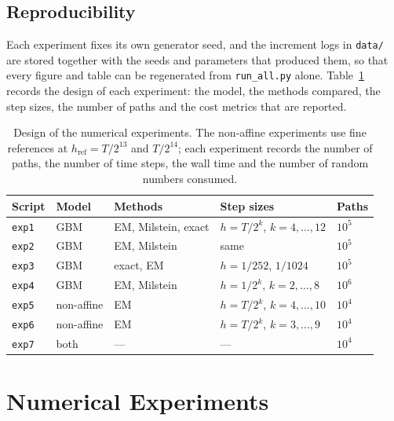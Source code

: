 \documentclass[11pt,a4paper]{article}
\theoremstyle{definition}
\theoremstyle{remark}
\begin{document}
\subsection{Reproducibility}
\label{sec:reproducibility}

Each experiment fixes its own generator seed, and the increment logs in
\texttt{data/} are stored together with the seeds and parameters that produced
them, so that every figure and table can be regenerated from
\texttt{run\_all.py} alone. Table~\ref{tab:experiment-design} records the design
of each experiment: the model, the methods compared, the step sizes, the number
of paths and the cost metrics that are reported.

\begin{table}[H]
\centering
\small
\begin{tabular}{lllll}
\toprule
\textbf{Script} & \textbf{Model} & \textbf{Methods} & \textbf{Step sizes}
    & \textbf{Paths} \\
\midrule
\texttt{exp1} & GBM        & EM, Milstein, exact
              & $h = T/2^k$, $k = 4, \ldots, 12$ & $10^5$ \\
\texttt{exp2} & GBM        & EM, Milstein
              & same                            & $10^5$ \\
\texttt{exp3} & GBM        & exact, EM
              & $h = 1/252$, $1/1024$           & $10^5$ \\
\texttt{exp4} & GBM        & EM, Milstein
              & $h = 1/2^k$, $k = 2, \ldots, 8$ & $10^6$ \\
\texttt{exp5} & non-affine & EM
              & $h = T/2^k$, $k = 4, \ldots, 10$ & $10^4$ \\
\texttt{exp6} & non-affine & EM
              & $h = T/2^k$, $k = 3, \ldots, 9$  & $10^4$ \\
\texttt{exp7} & both       & ---
              & ---                              & $10^4$ \\
\bottomrule
\end{tabular}
\caption{Design of the numerical experiments. The non-affine experiments use
fine references at $h_{\mathrm{ref}} = T/2^{13}$ and $T/2^{14}$; each experiment
records the number of paths, the number of time steps, the wall time and the
number of random numbers consumed.}
\label{tab:experiment-design}
\end{table}

\newpage
\section{Numerical Experiments}
\label{sec:experiments}
\end{document}
